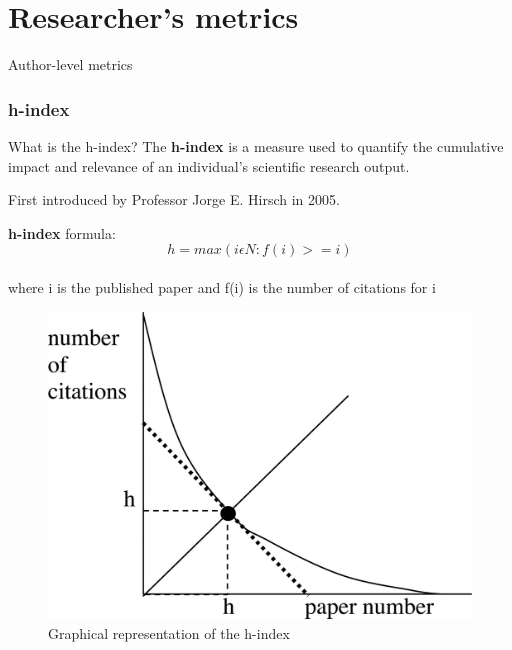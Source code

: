 \documentclass{beamer}
\begin{document}
\section{Researcher's metrics}
\begin{frame}
    \centering \Large Author-level metrics
\end{frame}
\begin{frame}
    \frametitle{h-index}

    \begin{block}{What is the h-index?}
        The \textbf{h-index} is a measure used to quantify the cumulative impact and relevance of an individual’s scientific research output.\cite{h-index}
    \end{block}

    \begin{alertblock}{}
        First introduced by Professor Jorge E. Hirsch in 2005.
    \end{alertblock}
    \textbf{h-index} formula:
    \[
        h = max(i ϵ Ν:f(i)>=i)
    \] \\
    where
   \centering i is the published paper and f(i) is the number of citations for i
    \begin{figure}[h]
        \includegraphics[height=0.3\textheight]{h-index_plot2.png}
        \caption{Graphical representation of the h-index}
    \end{figure}
\end{frame}
\end{document}
